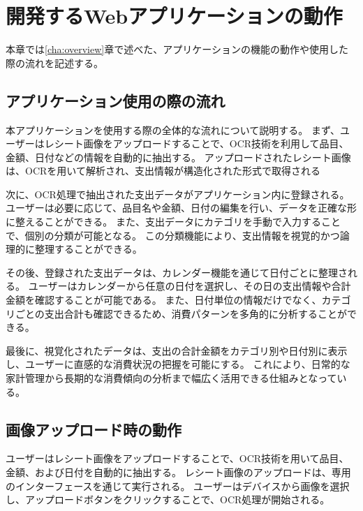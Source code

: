 \documentclass[main]{subfiles}
\begin{document}
\chapter{開発するWebアプリケーションの動作}
\label{cha:motion}
本章では\ref{cha:overview}章で述べた、アプリケーションの機能の動作や使用した際の流れを記述する。

\section{アプリケーション使用の際の流れ}

本アプリケーションを使用する際の全体的な流れについて説明する。
まず、ユーザーはレシート画像をアップロードすることで、OCR技術を利用して品目、金額、日付などの情報を自動的に抽出する。
アップロードされたレシート画像は、OCRを用いて解析され、支出情報が構造化された形式で取得される

次に、OCR処理で抽出された支出データがアプリケーション内に登録される。
ユーザーは必要に応じて、品目名や金額、日付の編集を行い、データを正確な形に整えることができる。
また、支出データにカテゴリを手動で入力することで、個別の分類が可能となる。
この分類機能により、支出情報を視覚的かつ論理的に整理することができる。

その後、登録された支出データは、カレンダー機能を通じて日付ごとに整理される。
ユーザーはカレンダーから任意の日付を選択し、その日の支出情報や合計金額を確認することが可能である。
また、日付単位の情報だけでなく、カテゴリごとの支出合計も確認できるため、消費パターンを多角的に分析することができる。

最後に、視覚化されたデータは、支出の合計金額をカテゴリ別や日付別に表示し、ユーザーに直感的な消費状況の把握を可能にする。
これにより、日常的な家計管理から長期的な消費傾向の分析まで幅広く活用できる仕組みとなっている。

\section{画像アップロード時の動作}

ユーザーはレシート画像をアップロードすることで、OCR技術を用いて品目、金額、および日付を自動的に抽出する。
レシート画像のアップロードは、専用のインターフェースを通じて実行される。
ユーザーはデバイスから画像を選択し、アップロードボタンをクリックすることで、OCR処理が開始される。

\end{document}
